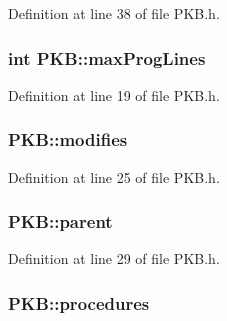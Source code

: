 Definition at line 38 of file P\-K\-B.\-h.

\hypertarget{class_p_k_b_ae3b310bfb545d59911cd4f6bb54ebd94}{
\subsubsection[{max\-Prog\-Lines}]{\setlength{\rightskip}{0pt plus 5cm}int P\-K\-B\-::max\-Prog\-Lines\hspace{0.3cm}{\ttfamily [static]}}}\label{class_p_k_b_ae3b310bfb545d59911cd4f6bb54ebd94}


Definition at line 19 of file P\-K\-B.\-h.

\hypertarget{class_p_k_b_acdeea65712ec5e26401bf04ca41fa526}{
\subsubsection[{modifies}]{ P\-K\-B\-::modifies\hspace{0.3cm}{\ttfamily [static]}}}\label{class_p_k_b_acdeea65712ec5e26401bf04ca41fa526}


Definition at line 25 of file P\-K\-B.\-h.

\hypertarget{class_p_k_b_a92894a22bbf3b6e449f30c6bee9f070a}{
\subsubsection[{parent}]{ P\-K\-B\-::parent\hspace{0.3cm}{\ttfamily [static]}}}\label{class_p_k_b_a92894a22bbf3b6e449f30c6bee9f070a}


Definition at line 29 of file P\-K\-B.\-h.

\hypertarget{class_p_k_b_ae426b49eef5572e594a3a465e6e462b3}{
\subsubsection[{procedures}]{ P\-K\-B\-::procedures\hspace{0.3cm}{\ttfamily [static]}}}\label{class_p_k_b_ae426b49eef5572e594a3a465e6e462b3}


